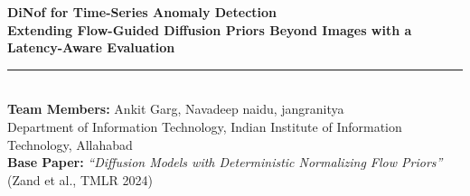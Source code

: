 \documentclass[aspectratio=169, 11pt]{beamer}
\begin{document}
\begin{frame}[plain]
  \vspace{1.2cm}
  {\color{NavyDark}\huge \textbf{DiNof for Time-Series Anomaly Detection}}\\[6pt]
  {\color{BlueAccent}\large \textbf{Extending Flow-Guided Diffusion Priors Beyond Images with a Latency-Aware Evaluation}}\\[14pt]
  
  \rule{\textwidth}{0.8pt}\\[12pt]
  
  {\small \textbf{Team Members:} Ankit Garg, Navadeep naidu, jangranitya}\\[3pt]
  {\footnotesize Department of Information Technology, Indian Institute of Information Technology, Allahabad}\\[10pt]
  
  {\scriptsize \textbf{Base Paper:} \textit{``Diffusion Models with Deterministic Normalizing Flow Priors''} (Zand et al., TMLR 2024)}
\end{frame}
\end{document}
